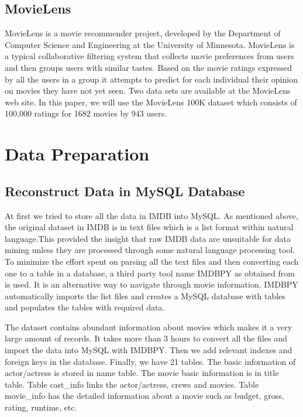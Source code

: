 \documentclass[conference]{IEEEtran}
\begin{document}
\subsection{MovieLens}
MovieLens is a movie recommender project, developed by the Department of Computer Science and Engineering at the University of Minnesota. MovieLens is a typical collaborative filtering system that collects movie preferences from users and then groups users with similar tastes. Based on the movie ratings expressed by all the users in a group it attempts to predict for each individual their opinion on movies they have not yet seen. Two data sets are available at the MovieLens web site\cite{movielens}. In this paper, we will use the MovieLens 100K dataset which consists of 100,000 ratings for 1682 movies by 943 users.


\section{Data Preparation}

\subsection{Reconstruct Data in MySQL Database}
At first we tried to store all the data in IMDB into MySQL. As mentioned above, the original dataset in IMDB is in text files which is a list format within natural language.This provided the insight that raw IMDB data are unsuitable for data mining unless they are processed through some natural language processing tool. To minimize the effort spent on parsing all the text files and then converting each one to a table in a database, a third party tool name IMDBPY as obtained from\cite{imdbpy} is used. It is an alternative way to navigate through movie information. IMDBPY automatically imports the list files and creates a MySQL database with tables and populates the tables with required data. 

The dataset contains abundant information about movies which makes it a very large amount of records. It takes more than 3 hours to convert all the files and import the data into MySQL with IMDBPY. Then we add relevant indexes and foreign keys in the database. Finally, we have 21 tables. The basic information of actor/actress is stored in name table. The movie basic information is in title table. Table cast\_info links the actor/actress, crews and movies. Table movie\_info has the detailed information about a movie such as budget, gross, rating, runtime, etc.
\end{document}
